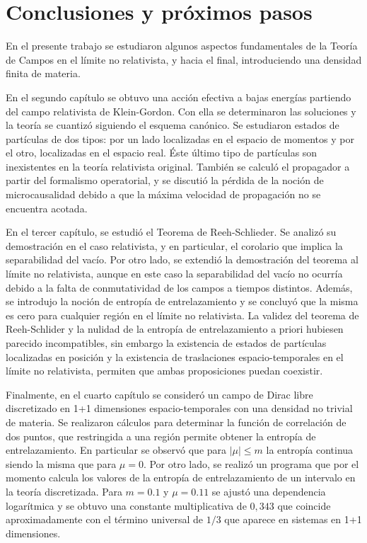 \chapter{Conclusiones y próximos pasos}\label{cap5}

En el presente trabajo se estudiaron algunos aspectos fundamentales de la Teoría de Campos en el límite no relativista, y hacia el final, introduciendo una densidad finita de materia.

En el segundo capítulo se obtuvo una acción efectiva a bajas energías partiendo del campo relativista de Klein-Gordon. Con ella se determinaron las soluciones y la teoría se cuantizó siguiendo el esquema canónico. Se estudiaron estados de partículas de dos tipos: por un lado localizadas en el espacio de momentos  y por el otro, localizadas en el espacio real. Éste último tipo de partículas son inexistentes en la teoría relativista original. También se calculó el propagador a partir del formalismo operatorial, y se discutió la pérdida de la noción de microcausalidad debido a que la máxima velocidad de propagación no se encuentra acotada.

En el tercer capítulo, se estudió el Teorema de Reeh-Schlieder. Se analizó su demostración en el caso relativista, y en particular, el corolario que implica la separabilidad del vacío. Por otro lado, se extendió la demostración del teorema al límite no relativista, aunque en este caso la separabilidad del vacío no ocurría debido a la falta de conmutatividad de los campos a tiempos distintos. Además, se introdujo la noción de entropía de entrelazamiento y se concluyó que la misma es cero para cualquier región en el límite no relativista. La validez del teorema de Reeh-Schlider y la nulidad de la entropía de entrelazamiento a priori hubiesen parecido incompatibles, sin embargo la existencia de estados de partículas localizadas en posición y la existencia de traslaciones espacio-temporales en el límite no relativista, permiten que ambas proposiciones puedan coexistir.



Finalmente, en el cuarto capítulo se consideró un campo de Dirac libre discretizado en 1+1 dimensiones espacio-temporales con una densidad no trivial de materia. Se realizaron cálculos para determinar la función de correlación de dos puntos, que restringida a una región permite obtener la entropía de entrelazamiento. En particular se observó que para $|\mu|\leq m$ la entropía continua siendo la misma que para $\mu=0$. Por otro lado, se realizó un programa que por el momento calcula los valores de la entropía de entrelazamiento de un intervalo en la teoría discretizada. Para $m=0.1$ y $\mu=0.11$ se ajustó una dependencia logarítmica y se obtuvo una constante multiplicativa de $0,343$ que coincide aproximadamente con el término universal de $1/3$ que aparece en sistemas en 1+1 dimensiones. 


